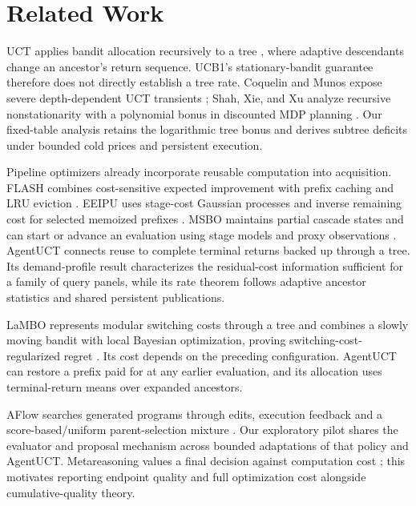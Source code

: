 \section{Related Work}
UCT applies bandit allocation recursively to a tree \citep{kocsis2006bandit}, where adaptive descendants change an ancestor's return sequence. UCB1's stationary-bandit guarantee \citep{auer2002finite} therefore does not directly establish a tree rate. Coquelin and Munos expose severe depth-dependent UCT transients \citep{coquelin2007bandit}; Shah, Xie, and Xu analyze recursive nonstationarity with a polynomial bonus in discounted MDP planning \citep{shah2020mcts}. Our fixed-table analysis retains the logarithmic tree bonus and derives subtree deficits under bounded cold prices and persistent execution.

Pipeline optimizers already incorporate reusable computation into acquisition.
FLASH combines cost-sensitive expected improvement with prefix caching and LRU
eviction \citep{zhang2016flash}. EEIPU uses stage-cost Gaussian processes and
inverse remaining cost for selected memoized prefixes \citep{essofi2024memoization}.
MSBO maintains partial cascade states and can start or advance an evaluation
using stage models and proxy observations \citep{torresi2026multistage}.
AgentUCT connects reuse to complete terminal returns backed up through a tree.
Its demand-profile result characterizes the residual-cost information sufficient
for a family of query panels, while its rate theorem follows adaptive ancestor
statistics and shared persistent publications.

LaMBO represents modular switching costs through a tree and combines a slowly
moving bandit with local Bayesian optimization, proving switching-cost-regularized
regret \citep{lin2021lambo}. Its cost depends on the preceding configuration.
AgentUCT can restore a prefix paid for at any earlier evaluation, and its
allocation uses terminal-return means over expanded ancestors.

AFlow searches generated programs through edits, execution feedback and a
score-based/uniform parent-selection mixture \citep{zhang2024aflow}. Our exploratory
pilot shares the evaluator and proposal mechanism across bounded adaptations
of that policy and AgentUCT. Metareasoning values a final decision against
computation cost \citep{hay2012selecting}; this motivates reporting endpoint
quality and full optimization cost alongside cumulative-quality theory.
